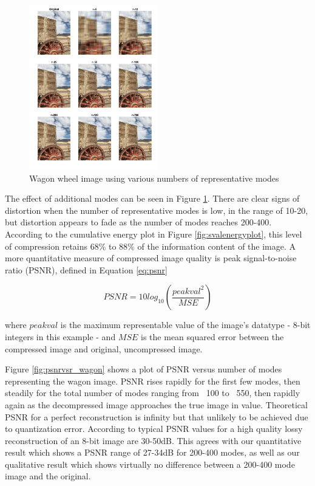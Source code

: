\documentclass[conference]{IEEEtran}
\begin{document}
    \begin{figure}[t]
    \includegraphics[width=0.5\textwidth]{show_different_r_wagon}
    \caption{Wagon wheel image using various numbers of representative modes}
    \label{fig:showwagondiffr}
    \end{figure}

    The effect of additional modes can be seen in Figure \ref{fig:showwagondiffr}. There are clear signs of distortion when the number of representative modes is low, in the range of 10-20, but distortion appears to fade as the number of modes reaches 200-400. According to the cumulative energy plot in Figure \ref{fig:svalenergyplot}, this level of compression retains 68\% to 88\% of the information content of the image. A more quantitative measure of compressed image quality is peak signal-to-noise ratio (PSNR), defined in Equation \ref{eq:psnr}

    \begin{equation}
    		PSNR = 10log_{10}(\frac{peakval^2}{MSE})
    \label{eq:psnr}
    \end{equation}

    where $peakval$ is the maximum representable value of the image's datatype - 8-bit integers in this example - and $MSE$ is the mean squared error between the compressed image and original, uncompressed image.

    Figure \ref{fig:psnrvsr_wagon} shows a plot of PSNR versus number of modes representing the wagon image. PSNR rises rapidly for the first few modes, then steadily for the total number of modes ranging from ~100 to ~550, then rapidly again as the decompressed image approaches the true image in value. Theoretical PSNR for a perfect reconstruction is infinity but that unlikely to be achieved due to quantization error. According to \cite{psnr_quality} typical PSNR values for a high quality lossy reconstruction of an 8-bit image are 30-50dB. This agrees with our quantitative result which shows a PSNR range of 27-34dB for 200-400 modes, as well as our qualitative result which shows virtually no difference between a 200-400 mode image and the original.
\end{document}
